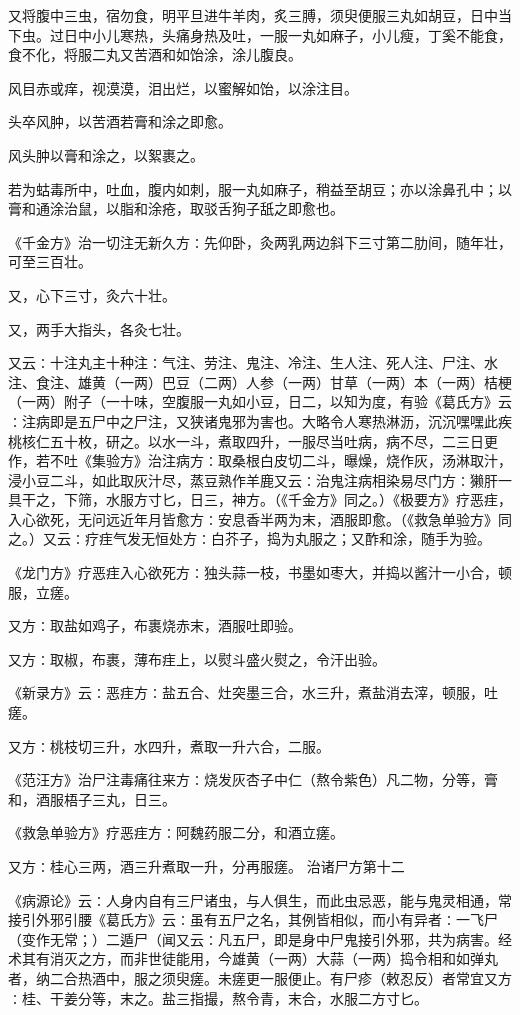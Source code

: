 \documentclass[a4paper,12pt,UTF8,twoside]{ctexbook}
\begin{document}
又将腹中三虫，宿勿食，明平旦进牛羊肉，炙三膊，须臾便服三丸如胡豆，日中当下虫。过日中小儿寒热，头痛身热及吐，一服一丸如麻子，小儿瘦，丁奚不能食，食不化，将服二丸又苦酒和如饴涂，涂儿腹良。

风目赤或痒，视漠漠，泪出烂，以蜜解如饴，以涂注目。

头卒风肿，以苦酒若膏和涂之即愈。

风头肿以膏和涂之，以絮裹之。

若为蛄毒所中，吐血，腹内如刺，服一丸如麻子，稍益至胡豆；亦以涂鼻孔中；以膏和通涂治鼠，以脂和涂疮，取驳舌狗子舐之即愈也。

《千金方》治一切注无新久方∶先仰卧，灸两乳两边斜下三寸第二肋间，随年壮，可至三百壮。

又，心下三寸，灸六十壮。

又，两手大指头，各灸七壮。

又云∶十注丸主十种注∶气注、劳注、鬼注、冷注、生人注、死人注、尸注、水注、食注、雄黄（一两）巴豆（二两）人参（一两）甘草（一两）本（一两）桔梗（一两）附子（一十味，空腹服一丸如小豆，日二，以知为度，有验《葛氏方》云∶注病即是五尸中之尸注，又狭诸鬼邪为害也。大略令人寒热淋沥，沉沉嘿嘿此疾桃核仁五十枚，研之。以水一斗，煮取四升，一服尽当吐病，病不尽，二三日更作，若不吐《集验方》治注病方∶取桑根白皮切二斗，曝燥，烧作灰，汤淋取汁，浸小豆二斗，如此取灰汁尽，蒸豆熟作羊鹿又云∶治鬼注病相染易尽门方∶獭肝一具干之，下筛，水服方寸匕，日三，神方。（《千金方》同之。）《极要方》疗恶疰，入心欲死，无问远近年月皆愈方∶安息香半两为末，酒服即愈。（《救急单验方》同之。）又云∶疗疰气发无恒处方∶白芥子，捣为丸服之；又酢和涂，随手为验。

《龙门方》疗恶疰入心欲死方∶独头蒜一枝，书墨如枣大，并捣以酱汁一小合，顿服，立瘥。

又方∶取盐如鸡子，布裹烧赤末，酒服吐即验。

又方∶取椒，布裹，薄布疰上，以熨斗盛火熨之，令汗出验。

《新录方》云∶恶疰方∶盐五合、灶突墨三合，水三升，煮盐消去滓，顿服，吐瘥。

又方∶桃枝切三升，水四升，煮取一升六合，二服。

《范汪方》治尸注毒痛往来方∶烧发灰杏子中仁（熬令紫色）凡二物，分等，膏和，酒服梧子三丸，日三。

《救急单验方》疗恶疰方∶阿魏药服二分，和酒立瘥。

又方∶桂心三两，酒三升煮取一升，分再服瘥。
治诸尸方第十二

《病源论》云∶人身内自有三尸诸虫，与人俱生，而此虫忌恶，能与鬼灵相通，常接引外邪引腰《葛氏方》云∶虽有五尸之名，其例皆相似，而小有异者∶一飞尸（变作无常；）二遁尸（闻又云∶凡五尸，即是身中尸鬼接引外邪，共为病害。经术其有消灭之方，而非世徒能用，今雄黄（一两）大蒜（一两）捣令相和如弹丸者，纳二合热酒中，服之须臾瘥。未瘥更一服便止。有尸疹（敕忍反）者常宜又方∶桂、干姜分等，末之。盐三指撮，熬令青，末合，水服二方寸匕。
\end{document}

